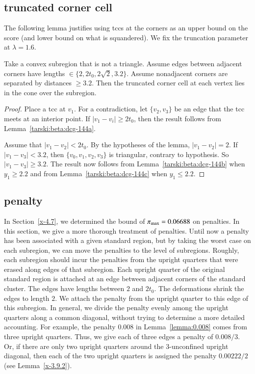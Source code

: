 \subsection{truncated corner cell} %

The following lemma justifies using tccs at the corners as an upper
bound on the score (and lower bound on what is squandered). We fix the
truncation parameter at $\lambda=1.6$.

\begin{lemma}
Take a convex subregion that is not a triangle.  Assume edges between
adjacent corners have lengths $\in\{2,2t_0,2\sqrt{2},3.2\}$. Assume
nonadjacent corners are separated by distances $\ge3.2$.  Then the
truncated corner cell at each vertex lies in the cone over the
subregion.
\end{lemma}

\begin{proof}
Place a tcc at $v_1$. For a contradiction, let $\{v_2,v_3\}$ be an
edge that the tcc meets at an interior point.  
If $|v_1-v_i|\ge 2t_0$, then the result follows from
Lemma~\ref{tarski:beta:dcg-144a}.  

Assume that
 $|v_1-v_2|<2t_0$.  By the hypotheses of the lemma,
$|v_1-v_2|=2$.  If $|v_1-v_3|<3.2$, then $\{v_0,v_1,v_2,v_3\}$ is
triangular, contrary to hypothesis.  So $|v_1-v_3|\ge3.2$.
The result now follows from Lemma~\ref{tarski:beta:dcg-144b} when
$y_1\ge 2.2$ and from Lemma~\ref{tarski:beta:dcg-144c} when
$y_1\le 2.2$.
\end{proof}


\subsection{penalty} %
    \label{sec:penalty1}

In Section~\ref{x-4.7}, we determined the bound of
$\pi_{\max}=0.06688$ on penalties. In this section, we give a more
thorough treatment of penalties. Until now a penalty has been
associated with a given standard region, but by taking the worst
case on each subregion, we can move the penalties to the level of
subregions.   Roughly, each subregion should incur the penalties
from the upright quarters that were erased along edges of that
subregion.  Each upright quarter of the original standard region
is attached at an edge between adjacent corners of the standard
cluster. The edges have lengths between $2$ and $2t_0$.  The
deformations shrink the edges to length $2$.  We attach the
penalty from the upright quarter to this edge of this subregion.
In general, we divide the penalty evenly among the upright
quarters along a common diagonal, without trying to determine a
more detailed accounting. For example, the penalty $0.008$ in
Lemma~\ref{lemma:0.008} comes from three upright quarters.  Thus,
we give each of three edges a penalty of $0.008/3$. Or, if there
are only two upright quarters around the $3$-unconfined upright
diagonal, then each of the two upright quarters is assigned the
penalty $0.00222/2$ (see Lemma~\ref{x-3.9.2}).

